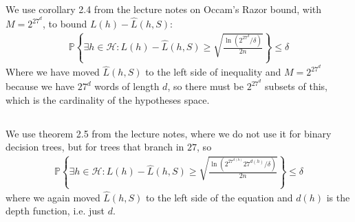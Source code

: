 \documentclass[a4paper]{article}
\begin{document}
\subsection{}
We use corollary 2.4 from the lecture notes on Occam's Razor bound, with $M=2^{27^d}$, to bound $L(h)-\hat{L}(h,S)$:
\begin{align*}
\mathbb{P}\left\{ \exists h \in \mathcal{H}:L(h)-\hat{L}(h,S)\geq \sqrt{\frac{\ln(2^{27^d}/\delta)}{2n}}\right\}\leq \delta
\end{align*}
Where we have moved $\hat{L}(h,S)$ to the left side of inequality and $M=2^{27^d}$ because we have $27^d$ words of length $d$, so there must be $2^{27^d}$ subsets of this, which is the cardinality of the hypotheses space.

\subsection{}
We use theorem 2.5 from the lecture notes, where we do not use it for binary decision trees, but for trees that branch in $27$, so
\begin{align*}
\mathbb{P}\left\{ \exists h \in \mathcal{H}:L(h)-\hat{L}(h,S)\geq \sqrt{\frac{\ln(2^{27^{d(h)}}27^{d(h)}/\delta)}{2n}}\right\}\leq \delta
\end{align*}
where we again moved $\hat{L}(h,S)$ to the left side of the equation and $d(h)$ is the depth function, i.e. just $d$.
\end{document}
